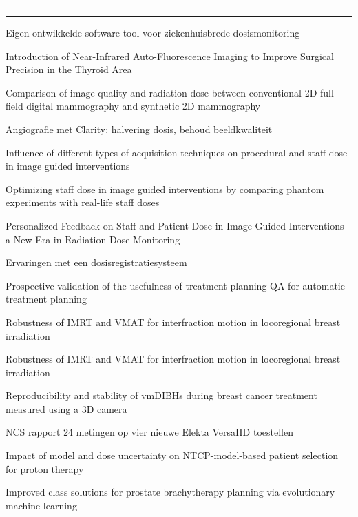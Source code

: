 \documentclass[a4paper,10pt]{report}
\begin{document}
\begin{multicols*}{3}
\columnbreak
\hrule\vspace{2mm}
\vspace{2mm}\hrule\strut
\begin{packed_enum}
\item[\#1] Eigen ontwikkelde software tool voor ziekenhuisbrede dosismonitoring  
\item[\#2] Introduction of Near-Infrared Auto-Fluorescence Imaging to Improve Surgical Precision in the Thyroid Area
\item[\#3] Comparison of image quality and radiation dose between conventional 2D full field digital mammography and synthetic 2D mammography
\item[\#4] Angiografie met Clarity: halvering dosis, behoud beeldkwaliteit
\item[\#5] Influence of different types of acquisition techniques on procedural and staff dose in image guided interventions
\item[\#6] Optimizing staff dose in image guided interventions by comparing phantom experiments with real-life staff doses
\item[\#7] Personalized Feedback on Staff and Patient Dose in Image Guided Interventions – a New Era in Radiation Dose Monitoring
\item[\#8] Ervaringen met een dosisregistratiesysteem
\item[\#9] Prospective validation of the usefulness of treatment planning QA for  automatic treatment planning
\item[\#10] Robustness of IMRT and VMAT for interfraction motion in locoregional breast irradiation
\item[\#11] Robustness of IMRT and VMAT for interfraction motion in locoregional breast irradiation
\item[\#12] Reproducibility and stability of vmDIBHs during breast cancer treatment measured using a 3D camera
\item[\#13] NCS rapport 24 metingen op vier nieuwe Elekta VersaHD toestellen
\item[\#14] Impact of model and dose uncertainty on NTCP-model-based patient selection for proton therapy
\item[\#15] Improved class solutions for prostate brachytherapy planning via evolutionary machine learning
\end{packed_enum} %
\vfill
\strut



\end{multicols*}
\end{document}
